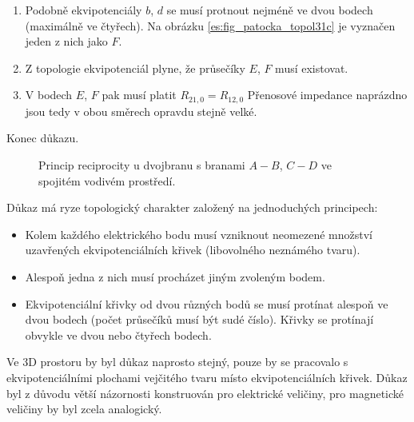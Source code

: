 \begin{enumerate}[noitemsep]
          \item Podobně ekvipotenciály \(b\), \(d\) se musí protnout nejméně ve dvou bodech 
                (maximálně ve čtyřech). Na obrázku \ref{es:fig_patocka_topol31c} je vyznačen jeden 
                z nich jako \(F\).
          
          \item Z topologie ekvipotenciál plyne, že průsečíky \(E\), \(F\) musí existovat.
          
          \item V bodech \(E\), \(F\) pak musí platit \(R_{21,0} = R_{12,0}\) Přenosové impedance 
                naprázdno jsou tedy v obou směrech opravdu stejně velké.
        \end{enumerate}
        Konec důkazu.
        \begin{figure}[ht!]
          \centering  
             \newline
             \newline
          \caption{Princip reciprocity u dvojbranu s branami \(A-B\), \(C-D\) ve spojitém vodivém 
                   prostředí. \cite[s.~65]{Patocka4}} 
          \label{es:fig_patocka_topol31}
        \end{figure} 
        
        Důkaz má ryze topologický charakter založený na jednoduchých principech:
        \begin{itemize}[noitemsep]
          \item Kolem každého elektrického bodu musí vzniknout neomezené množství uzavřených 
              ekvipotenciálních křivek (libovolného neznámého tvaru).
        
          \item Alespoň jedna z nich musí procházet jiným zvoleným bodem.
        
          \item Ekvipotenciální křivky od dvou různých bodů se musí protínat alespoň ve dvou bodech 
                (počet průsečíků musí být sudé číslo). Křivky se protínají obvykle ve dvou nebo 
                čtyřech bodech.
      \end{itemize}
      
        Ve 3D prostoru by byl důkaz naprosto stejný, pouze by se pracovalo s ekvipotenciálními
        plochami vejčitého tvaru místo ekvipotenciálních křivek. Důkaz byl z důvodu větší názornosti
        konstruován pro elektrické veličiny, pro magnetické veličiny by byl zcela analogický.
